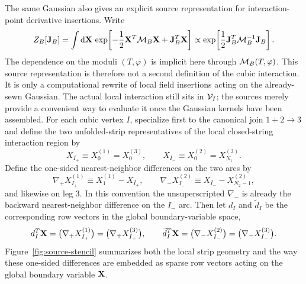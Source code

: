 \documentclass[11pt]{article}
\numberwithin{equation}{section}
\newcommand{\dd}{\mathrm{d}}
\begin{document}
The same Gaussian also gives an explicit source representation for interaction-point derivative insertions. Write
\begin{equation}
\label{eq:s8-007}
Z_B[{\bf J}_B]
=
\int \dd{\bf X}\,
\exp\!\left[
-\frac12 {\bf X}^T{\cal M}_B{\bf X}
+{\bf J}_B^T{\bf X}
\right]
\propto
\exp\!\left[\frac12 {\bf J}_B^T{\cal M}_B^{-1}{\bf J}_B\right].
\end{equation}
The dependence on the moduli $(T,\varphi)$ is implicit here through ${\cal M}_B(T,\varphi)$.
This source representation is therefore not a second definition of the cubic interaction. It is only a computational rewrite of local field insertions acting on the already-sewn Gaussian. The actual local interaction still sits in ${\cal V}_I$; the sources merely provide a convenient way to evaluate it once the Gaussian kernels have been assembled.
For each cubic vertex $I$, specialize first to the canonical join $1+2\to 3$ and define the two unfolded-strip representatives of the local closed-string interaction region by
\begin{equation}
\label{eq:s8-008}
X_{I_+}\equiv X_0^{(1)}=X_0^{(3)},
\qquad
X_{I_-}\equiv X_0^{(2)}=X_{N_1}^{(3)}.
\end{equation}
Define the one-sided nearest-neighbor differences on the two arcs by
\begin{equation}
\label{eq:s8-009}
\nabla_+X_{I_+}^{(1)}\equiv X_1^{(1)}-X_{I_+},
\qquad
\nabla_-X_{I_-}^{(2)}\equiv X_{I_-}-X_{N_2-1}^{(2)},
\end{equation}
and likewise on leg $3$. In this convention the unsuperscripted $\nabla_-$ is already the backward nearest-neighbor difference on the $I_-$ arc. Then let $d_I$ and $\widetilde d_I$ be the corresponding row vectors in the global boundary-variable space,
\begin{equation}
\label{eq:s8-010}
d_I^T{\bf X}=\bigl(\nabla_+X_{I_+}^{(1)}\bigr)=\bigl(\nabla_+X_{I_+}^{(3)}\bigr),
\qquad
\widetilde d_I^T{\bf X}=\bigl(\nabla_-X_{I_-}^{(2)}\bigr)=\bigl(\nabla_-X_{I_-}^{(3)}\bigr).
\end{equation}
Figure~\ref{fig:source-stencil} summarizes both the local strip geometry and the way these one-sided differences are embedded as sparse row vectors acting on the global boundary variable ${\bf X}$.
\end{document}
